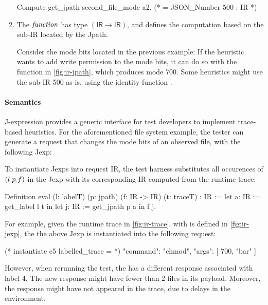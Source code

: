 \begin{enumerate}
\begin{coq}
  Compute get_jpath second_file_mode a2.
  (* = JSON_Number 500 : IR *)
\end{coq}
\item The $\mathit{function}$ has type $(\mathsf{IR}\to\mathsf{IR})$, and defines the
  computation based on the sub-IR located by the Jpath.

  Consider the mode bits located in the previous example: If the heuristic
  wants to add write permission to the mode bits, it can do so with the
   function in \autoref{fig:ir-jpath}, which produces mode
  700.  Some heuristics might use the sub-IR 500 as-is, using the identity
  function .
\end{enumerate}

\paragraph{Semantics}
J-expression provides a generic interface for test developers to implement
trace-based heuristics.  For the aforementioned file system example, the tester
can generate a request that changes the mode bits of an observed file, with the
following Jexp:

To instantiate Jexps into request IR, the test harness substitutes all
occurences of $(l.p.f)$ in the Jexp with its corresponding IR computed
from the runtime trace:
\begin{coq}
  Definition eval (l: labelT) (p: jpath) (f: IR -> IR) (t: traceT) : IR :=
    let a: IR := get_label l t in
    let j: IR := get_jpath p a in
    f j.
\end{coq}

For example, given the runtime trace in \autoref{fig:ir-trace}, with  is
defined in \autoref{fig:ir-jexp}, the the above Jexp is instantiated into the
following request:

\begin{json}
  (* instantiate e5 labelled_trace = *)
  { 
    "command": "chmod",
    "args": [ 700, "bar" ]
  }
\end{json}

However, when rerunning the test, the  has a different response
associated with label 4.  The new response  might have fewer than 2
files in its payload.  Moreover, the response  might have not appeared
in the trace, due to delays in the environment.

